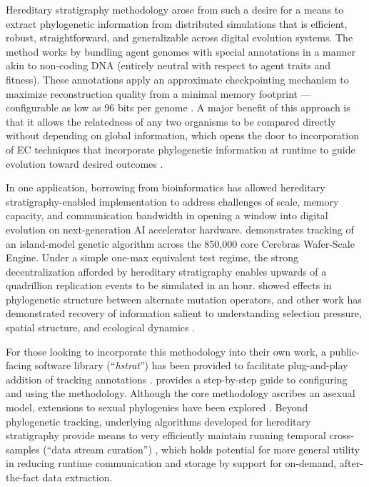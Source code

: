 Hereditary stratigraphy methodology arose from such a desire for a means to extract phylogenetic information from distributed simulations that is efficient, robust, straightforward, and generalizable across digital evolution systems.
The method works by bundling agent genomes with special annotations in a manner akin to non-coding DNA (entirely neutral with respect to agent traits and fitness).
These annotations apply an approximate checkpointing mechanism to maximize reconstruction quality from a minimal memory footprint --- configurable as low as 96 bits per genome \citep{moreno2022hereditary}.
A major benefit of this approach is that it allows the relatedness of any two organisms to be compared directly without depending on global information, which opens the door to incorporation of EC techniques that incorporate phylogenetic information at runtime to guide evolution toward desired outcomes \citep{lalejini2024phylogeny,lalejini2024runtime,murphy2008simple,burke2003increased}.

In one application, borrowing from bioinformatics has allowed hereditary stratigraphy-enabled implementation to address challenges of scale, memory capacity, and communication bandwidth in opening a window into digital evolution on next-generation AI accelerator hardware.
\citet{moreno2024trackable} demonstrates tracking of an island-model genetic algorithm across the 850,000 core Cerebras Wafer-Scale Engine.
Under a simple one-max equivalent test regime, the strong decentralization afforded by hereditary stratigraphy enables upwards of a quadrillion replication events to be simulated in an hour.
\citet{moreno2024trackable} showed effects in phylogenetic structure between alternate mutation operators, and other work has demonstrated recovery of information salient to understanding selection pressure, spatial structure, and ecological dynamics \citep{moreno2024ecology}.

For those looking to incorporate this methodology into their own work, a public-facing software library (``\textit{hstrat}'') has been provided to facilitate plug-and-play addition of tracking annotations  \citep{moreno2022hstrat}.
\citet{moreno2024guide} provides a step-by-step guide to configuring and using the methodology.
Although the core methodology ascribes an asexual model, extensions to sexual phylogenies have been explored \citep{moreno2024methods}.
Beyond phylogenetic tracking, underlying algorithms developed for hereditary stratigraphy provide means to very efficiently maintain running temporal cross-samples (``data stream curation'') \citep{moreno2024efficient}, which holds potential for more general utility in reducing runtime communication and storage by support for on-demand, after-the-fact data extraction.

